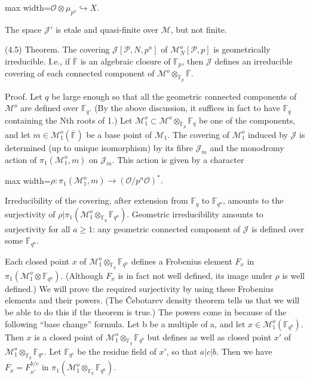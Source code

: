 \documentclass[11pt]{article}
\newcommand{\DFormula}[1]{\par\smallskip\noindent\begin{adjustbox}{max width=\linewidth}$\displaystyle #1$\end{adjustbox}\par\smallskip}
\begin{document}
\par
\DFormula{\mathcal{O}\otimes \mu _{p^{n}}\hookrightarrow X.}
\par
The space \(\mathcal{J}'\) is etale and quasi-finite over \(\mathcal{M}\), but not finite.\par
\par
(4.5) Theorem. The covering \(\mathcal{J}[\mathcal{P},N,p^{n}]\) of \(\mathcal{M}_{N}^{o}[\mathcal{P},p]\) is geometrically irreducible. I.e., if \(\overline{\mathbb{F}}\) is an algebraic closure of \(\mathbb{F}_{p}\), then \(\mathcal{J}\) defines an irreducible covering of each connected component of \(\mathcal{M}^{o}\otimes _{\mathbb{F}_{p}}\overline{\mathbb{F}}\).\par
\par
Proof. Let \(q\) be large enough so that all the geometric connected components of \(\mathcal{M}^{o}\) are defined over \(\mathbb{F}_{q}\). (By the above discussion, it suffices in fact to have \(\mathbb{F}_{q}\) containing the Nth roots of 1.) Let \(\mathcal{M}_{1}^{o}\subset \mathcal{M}^{o}\otimes _{\mathbb{F}_{p}}\mathbb{F}_{q}\) be one of the components, and let \(m\in \mathcal{M}_{1}^{o}(\overline{\mathbb{F}})\) be a base point of \(\mathcal{M}_{1}\). The covering of \(\mathcal{M}_{1}^{o}\) induced by \(\mathcal{J}\) is determined (up to unique isomorphism) by its fibre \(\mathcal{J}_{m}\) and the monodromy action of \(\pi _{1}(\mathcal{M}_{1}^{o},m)\) on \(\mathcal{J}_{m}\). This action is given by a character\par
\par
\DFormula{\rho :\pi _{1}(\mathcal{M}_{1}^{o},m)\to (\mathcal{O}/p^{n}\mathcal{O})^{\ast}.}
\par
Irreducibility of the covering, after extension from \(\mathbb{F}_{q}\) to \(\mathbb{F}_{q^{a}}\), amounts to the surjectivity of \(\rho \vert \pi _{1}(\mathcal{M}_{1}^{o}\otimes _{\mathbb{F}_{q}}\mathbb{F}_{q^{a}})\). Geometric irreducibility amounts to surjectivity for all \(a\geq 1\): any geometric connected component of \(\mathcal{J}\) is defined over some \(\mathbb{F}_{q^{a}}\).\par
\par
Each closed point \(x\) of \(\mathcal{M}_{1}^{o}\otimes _{\mathbb{F}_{q}}\mathbb{F}_{q^{a}}\) defines a Frobenius element \(F_{x}\) in \(\pi _{1}(\mathcal{M}_{1}^{o}\otimes \mathbb{F}_{q^{a}})\). (Although \(F_{x}\) is in fact not well defined, its image under \(\rho \) is well defined.) We will prove the required surjectivity by using these Frobenius elements and their powers. (The Čebotarev density theorem tells us that we will be able to do this if the theorem is true.) The powers come in because of the following “base change” formula. Let b be a multiple of a, and let \(x\in \mathcal{M}_{1}^{o}(\mathbb{F}_{q^{b}})\). Then \(x\) is a closed point of \(\mathcal{M}_{1}^{o}\otimes _{\mathbb{F}_{q}}\mathbb{F}_{q^{b}}\) but defines as well as closed point \(x'\) of \(\mathcal{M}_{1}^{o}\otimes _{\mathbb{F}_{q}}\mathbb{F}_{q^{a}}\). Let \(\mathbb{F}_{q^{c}}\) be the residue field of \(x'\), so that \(a\vert c\vert b\). Then we have \(F_{x}=F_{x'}^{b/c}\) in \(\pi _{1}(\mathcal{M}_{1}^{o}\otimes _{\mathbb{F}_{q}}\mathbb{F}_{q^{a}})\).\par
\end{document}
